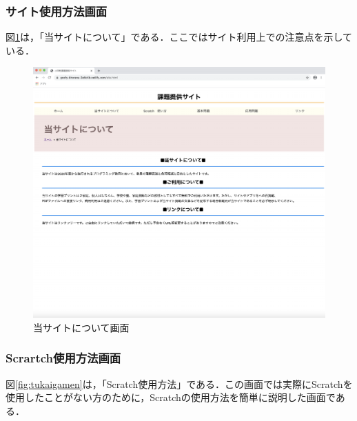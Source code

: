 \subsubsection{サイト使用方法画面}
図\ref{fig:tougamen}は，「当サイトについて」である．ここではサイト利用上での注意点を示している．
\begin{figure}[h]
\begin{center}
\includegraphics[width=15cm]{site.pdf}
\caption{当サイトについて画面}
\label{fig:tougamen}
\end{center}
\end{figure}

\newpage

\subsubsection{Scrartch使用方法画面}
図\ref{fig:tukaigamen}は，「Scratch使用方法」である．この画面では実際にScratchを使用したことがない方のために，Scratchの使用方法を簡単に説明した画面である．

